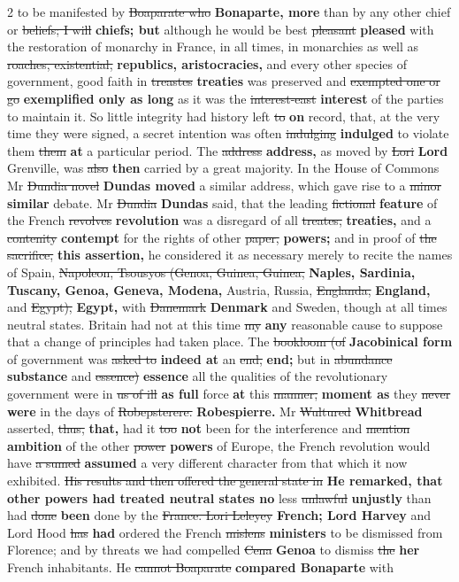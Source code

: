 \documentclass[10pt]{article}
\begin{document}
\begin{multicols}{2}
to be manifested by \sout{Boaparate who} \textbf{Bonaparte, more} than by any other chief or \sout{beliefs; I will} \textbf{chiefs; but} although he would be best \sout{pleasant} \textbf{pleased} with the restoration of monarchy in France, in all times, in monarchies as well as \sout{roaches, existential,} \textbf{republics, aristocracies,} and every other species of government, good faith in \sout{treastes} \textbf{treaties} was preserved and \sout{exempted one or go} \textbf{exemplified only as long} as it was the \sout{interest-east} \textbf{interest} of the parties to maintain it. So little integrity had history left \sout{to} \textbf{on} record, that, at the very time they were signed, a secret intention was often \sout{indulging} \textbf{indulged} to violate them \sout{them} \textbf{at} a particular period. The \sout{address} \textbf{address,} as moved by \sout{Lori} \textbf{Lord} Grenville, was \sout{also} \textbf{then} carried by a great majority. In the House of Commons Mr \sout{Dundia novel} \textbf{Dundas moved} a similar address, which gave rise to a \sout{minor} \textbf{similar} debate. Mr \sout{Dundia} \textbf{Dundas} said, that the leading \sout{fictional} \textbf{feature} of the French \sout{revolves} \textbf{revolution} was a disregard of all \sout{treates,} \textbf{treaties,} and a \sout{contenity} \textbf{contempt} for the rights of other \sout{paper,} \textbf{powers;} and in proof of \sout{the sacrifice,} \textbf{this assertion,} he considered it as necessary merely to recite the names of Spain, \sout{Napoleon, Tsousyos (Genoa, Guinea, Guinea,} \textbf{Naples, Sardinia, Tuscany, Genoa, Geneva, Modena,} Austria, Russia, \sout{Englanda,} \textbf{England,} and \sout{Egypt),} \textbf{Egypt,} with \sout{Danemark} \textbf{Denmark} and Sweden, though at all times neutral states. Britain had not at this time \sout{my} \textbf{any} reasonable cause to suppose that a change of principles had taken place. The \sout{bookloom (of} \textbf{Jacobinical form} of government was \sout{asked to} \textbf{indeed at} an \sout{end,} \textbf{end;} but in \sout{abundance} \textbf{substance} and \sout{essence)} \textbf{essence} all the qualities of the revolutionary government were in \sout{us of ill} \textbf{as full} force \textbf{at} this \sout{manner,} \textbf{moment as} they \sout{never} \textbf{were} in the days of \sout{Robepsterere.} \textbf{Robespierre.} Mr \sout{Wultured} \textbf{Whitbread} asserted, \sout{thus,} \textbf{that,} had it \sout{too} \textbf{not} been for the interference and \sout{mention} \textbf{ambition} of the other \sout{power} \textbf{powers} of Europe, the French revolution would have \sout{a sumed} \textbf{assumed} a very different character from that which it now exhibited. \sout{His results and then offered the general state in} \textbf{He remarked, that other powers had treated neutral states no} less \sout{unlawful} \textbf{unjustly} than had \sout{done} \textbf{been} done by the \sout{France. Lori Leleyey} \textbf{French; Lord Harvey} and Lord Hood \sout{has} \textbf{had} ordered the French \sout{mislens} \textbf{ministers} to be dismissed from Florence; and by threats we had compelled \sout{Cena} \textbf{Genoa} to dismiss \sout{the} \textbf{her} French inhabitants. He \sout{cannot Boaparate} \textbf{compared Bonaparte} with 
\end{multicols}
\end{document}
